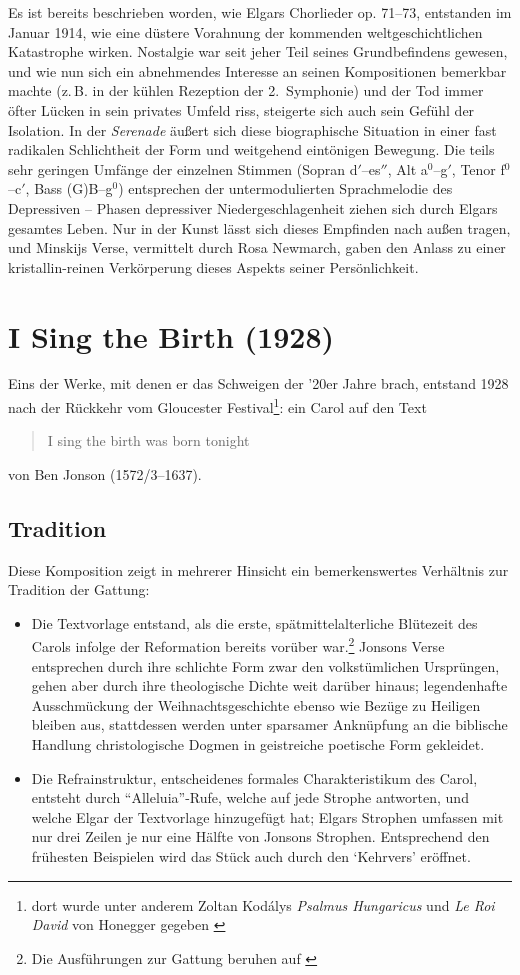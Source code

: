 \documentclass[a4paper,11pt,open=any]{scrbook}
\newcommand{\engquote}[1]{\foreignblockquote{english}{#1}}
\begin{document}
Es ist bereits beschrieben worden, wie Elgars Chorlieder op. 71–73,
entstanden im Januar 1914, wie eine düstere Vorahnung der kommenden
weltgeschichtlichen Katastrophe wirken.  Nostalgie war seit jeher Teil
seines Grundbefindens gewesen, und wie nun sich ein abnehmendes Interesse
an seinen Kompositionen bemerkbar machte (z.\,B. in der kühlen Rezeption
der 2.~Symphonie) und der Tod immer öfter Lücken in sein privates Umfeld
riss, steigerte sich auch sein Gefühl der Isolation.  In der \textit{Serenade}
äußert sich diese biographische Situation in einer fast radikalen Schlichtheit
der Form und weitgehend eintönigen Bewegung.  Die teils sehr geringen Umfänge
der einzelnen Stimmen (Sopran d$'$–es$''$, Alt a$^0$–g$'$, Tenor f$^0$–c$'$,
Bass (G)B–g$^0$) entsprechen der untermodulierten Sprachmelodie des Depressiven
– Phasen depressiver Niedergeschlagenheit ziehen sich durch Elgars gesamtes
Leben.  Nur in der Kunst lässt sich dieses Empfinden nach außen tragen, und
Minskijs Verse, vermittelt durch Rosa Newmarch, gaben den Anlass zu einer
kristallin-reinen Verkörperung dieses Aspekts seiner Persönlichkeit.

\section{I Sing the Birth \textmd{(1928)}}
Eins der Werke, mit denen er das Schweigen der ’20er Jahre brach, entstand
1928 nach der Rückkehr vom Gloucester Festival\footnote{dort wurde unter
anderem Zoltan Kodálys \textit{Psalmus Hungaricus} und \textit{Le Roi David}
von Honegger gegeben \parencite{gloucester}}: ein Carol\cite[S.~777]{moore}
auf den Text \engquote{I sing the birth was born tonight} von Ben Jonson
(1572/3–1637).

\subsection*{Tradition}
Diese Komposition zeigt in mehrerer Hinsicht ein bemerkenswertes Verhältnis
zur Tradition der Gattung:

\begin{itemize}
 \item Die Textvorlage entstand, als die erste, spätmittelalterliche Blütezeit
 des Carols infolge der Reformation bereits vorüber war.\footnote{Die
 Ausführungen zur Gattung beruhen auf \cite{carol}}  Jonsons Verse entsprechen
 durch ihre schlichte Form zwar den volkstümlichen Ursprüngen, gehen aber durch
 ihre theologische Dichte weit darüber hinaus; legendenhafte Ausschmückung der
 Weihnachtsgeschichte ebenso wie Bezüge zu Heiligen bleiben aus, stattdessen
 werden unter sparsamer Anknüpfung an die biblische Handlung christologische
 Dogmen in geistreiche poetische Form gekleidet.

 \item Die Refrainstruktur, entscheidenes formales Charakteristikum des Carol,
 entsteht durch \enquote{Alleluia}-Rufe, welche auf jede Strophe antworten,
 und welche Elgar der Textvorlage hinzugefügt hat;
 Elgars Strophen umfassen mit nur drei Zeilen je nur eine Hälfte von Jonsons
 Strophen.  Entsprechend den frühesten Beispielen wird das Stück auch durch den
 \enquote*{Kehrvers} eröffnet.
\end{itemize}
\end{document}
